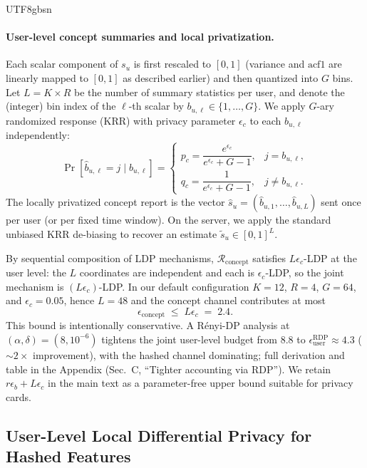 \documentclass[lettersize,journal]{IEEEtran}
\begin{document}
\begin{CJK*}{UTF8}{gbsn}
\paragraph{User-level concept summaries and local privatization.}
Each scalar component of $s_u$ is first rescaled to $[0,1]$ (variance and $\mathrm{acf1}$ are linearly mapped to $[0,1]$ as described earlier) and then quantized into $G$ bins. Let $L = K \times R$ be the number of summary statistics per user, and denote the (integer) bin index of the $\ell$-th scalar by $b_{u,\ell} \in \{1,\dots,G\}$. We apply $G$-ary randomized response (KRR) with privacy parameter $\epsilon_c$ to each $b_{u,\ell}$ independently:
\begin{equation}
  \Pr[\hat{b}_{u,\ell} = j \mid b_{u,\ell}]
  = \begin{cases}
      p_c = \dfrac{e^{\epsilon_c}}{e^{\epsilon_c} + G - 1}, & j = b_{u,\ell},\\[0.6ex]
      q_c = \dfrac{1}{e^{\epsilon_c} + G - 1}, & j \neq b_{u,\ell}.
    \end{cases}
\end{equation}
The locally privatized concept report is the vector
$\hat{s}_u = (\hat{b}_{u,1},\dots,\hat{b}_{u,L})$ sent once per user (or per fixed time window). On the server, we apply the standard unbiased KRR de-biasing to recover an estimate $\tilde{s}_u \in [0,1]^L$.

By sequential composition of LDP mechanisms, $\mathcal{R}_{\text{concept}}$ satisfies $L\epsilon_c$-LDP at the user level: the $L$ coordinates are independent and each is $\epsilon_c$-LDP, so the joint mechanism is $(L\epsilon_c)$-LDP. In our default configuration $K{=}12$, $R{=}4$, $G{=}64$, and $\epsilon_c{=}0.05$, hence $L{=}48$ and the concept channel contributes at most
\begin{equation}
  \epsilon_{\text{concept}} \;\le\; L \epsilon_c \;=\; 2.4.
\end{equation}
This bound is intentionally conservative. A R\'enyi-DP analysis at $(\alpha,\delta){=}(8,10^{-6})$ tightens the joint user-level budget from $8.8$ to $\epsilon_{\text{user}}^{\text{RDP}}{\approx}4.3$ ($\sim\!2{\times}$ improvement), with the hashed channel dominating; full derivation and table in the Appendix (Sec.~C, ``Tighter accounting via RDP''). We retain $r\epsilon_b{+}L\epsilon_c$ in the main text as a parameter-free upper bound suitable for privacy cards.



\subsection{User-Level Local Differential Privacy for Hashed Features}
\label{sec:ldp}


\end{CJK*}
\end{document}
